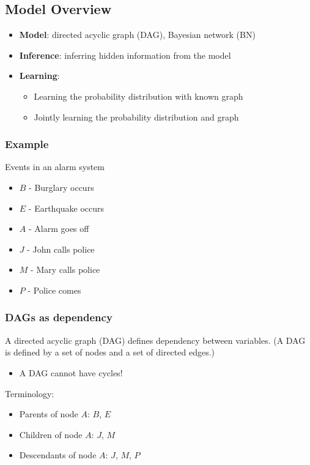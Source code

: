 \documentclass[10pt]{article}
\begin{document}
\subsection*{Model Overview}
\begin{itemize}
	\item \textbf{Model}: directed acyclic graph (DAG), Bayesian network (BN)
	\item \textbf{Inference}: inferring hidden information from the model
	\item \textbf{Learning}:
	\begin{itemize}
	    \item Learning the probability distribution with known graph
	    \item Jointly learning the probability distribution and graph
    \end{itemize}
\end{itemize}

\subsubsection*{Example}
Events in an alarm system
\begin{center}
\end{center}
\begin{itemize}
	\item $B$ - Burglary occurs
	\item $E$ - Earthquake occurs
	\item $A$ - Alarm goes off
	\item $J$ - John calls police
	\item $M$ - Mary calls police
	\item $P$ - Police comes
\end{itemize}

\subsubsection*{DAGs as dependency}
A directed acyclic graph (DAG) defines dependency between variables.  (A DAG is defined by a set of nodes and a set of directed edges.)
\begin{itemize}
	\item A DAG cannot have cycles!
\end{itemize}
Terminology:
\begin{itemize}
	\item Parents of node $A$: $B$, $E$
	\item Children of node $A$: $J$, $M$
	\item Descendants of node $A$: $J$, $M$, $P$
\end{itemize}
\end{document}
